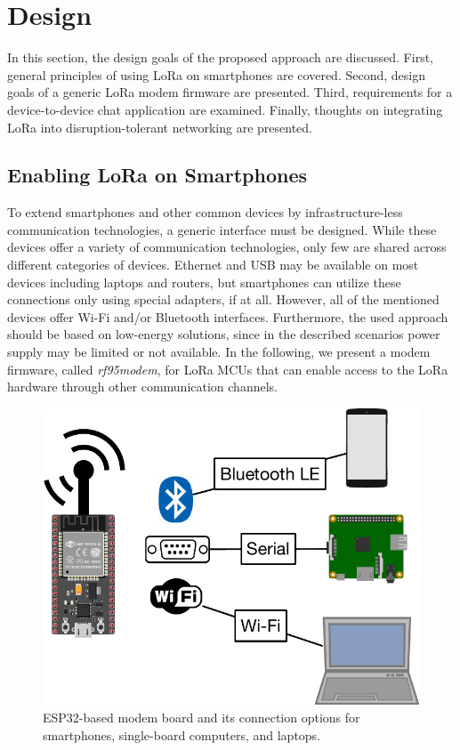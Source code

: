 \section{Design}
\label{sec:design}

In this section, the design goals of the proposed approach are discussed.
First, general principles of using LoRa on smartphones are covered.
Second, design goals of a generic LoRa modem firmware are presented.
Third, requirements for a device-to-device chat application are examined.
Finally, thoughts on integrating LoRa into disruption-tolerant networking are presented.

\subsection{Enabling LoRa on Smartphones}
To extend smartphones and other common devices by infrastructure-less communication technologies, a generic interface must be designed.
While these devices offer a variety of communication technologies, only few are shared across different categories of devices.
Ethernet and USB may be available on most devices including laptops and routers, but smartphones can utilize these connections only using special adapters, if at all. 
However, all of the mentioned devices offer Wi-Fi and/or Bluetooth interfaces.
Furthermore, the used approach should be based on low-energy solutions, since in the described scenarios power supply may be limited or not available.
In the following, we present a modem firmware, called \textit{rf95modem},  for LoRa MCUs that can enable access to the LoRa hardware through other communication channels.

\begin{figure}[ht!]
    \centering
    \includegraphics[width=.5\columnwidth]{gfx/rf95modem-connections.pdf}
    \caption{ESP32-based modem board and its connection options for smartphones, single-board computers, and laptops.}
    \label{fig:rf95modem}
\end{figure}

